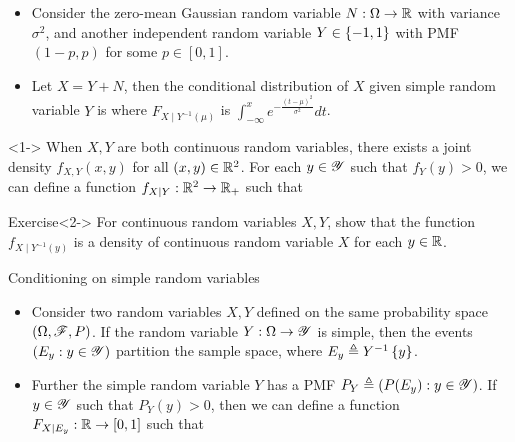 \documentclass[12pt,aspectratio=169]{beamer}
\begin{document}
\begin{frame}



\begin{Example}
\begin{itemize}
\item <1-> Consider the zero-mean Gaussian random variable $N:\Omega\to\mathbb{R}$ with variance $\sigma^2$, and another independent random variable $Y \in \left\{-1,1\right\}$ with PMF $(1-p, p)$ for some $p \in [0,1]$. 
\item <2-> Let $X = Y + N$, then the conditional distribution of $X$ given simple random variable $Y$ is 
where $F_{X\mid Y^{-1}(\mu)}$ is $\int_{-\infty}^xe^{-\frac{(t-\mu)^2}{\sigma^2}}dt$.
\end{itemize}
\end{Example}
\end{frame}

\begin{frame}

\begin{Definition}<1-> 
When $X, Y$ are both continuous random variables, 
there exists a joint density $f_{X,Y}(x,y)$ for all $(x, y) \in \mathbb{R}^2$. 
For each $y \in \mathscr{Y}$ such that $f_Y(y) > 0$, we can define a function $f_{X\mid Y}: \mathbb{R}^2 \to \mathbb{R}_+$ such that   
\end{Definition}


\begin{block}{Exercise}<2->
For continuous random variables $X,Y$, 
show that the function $f_{X\mid Y^{-1}(y)}$ is a density of continuous random variable $X$ for each $y\in \mathbb{R}$. 
\end{block}
\end{frame}

\begin{frame}{Conditioning on simple random variables}
\begin{itemize}
\item <1-> Consider two random variables $X, Y$ defined on the same probability space $(\Omega, \mathscr{F}, P)$.  
If the random variable $Y: \Omega \to \mathscr{Y}$ is simple, then the events $(E_y: y \in \mathscr{Y})$ partition the sample space, 
where $E_y \triangleq Y^{-1}\left\{y\right\}$. 
\item <2-> Further the simple random variable $Y$ has a PMF $P_Y \triangleq (P(E_y): y \in \mathscr{Y})$.   
If $y \in \mathscr{Y}$ such that $P_Y(y)>0$, then we can define a function $F_{X|E_y}: \mathbb{R}\to[0,1]$ 
such that
\end{itemize}
\end{frame}
\end{document}

